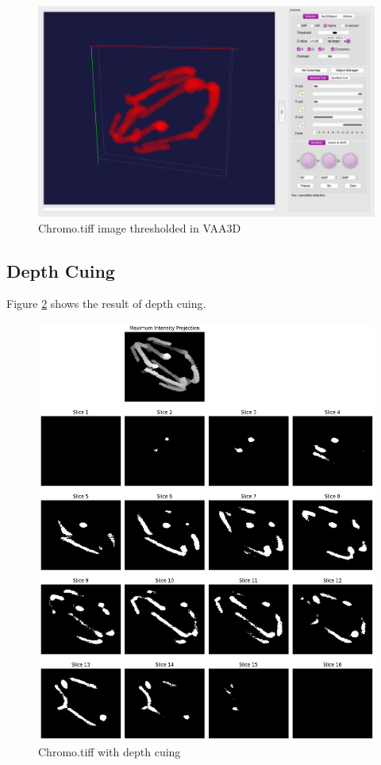 \documentclass{article}
\begin{document}
\begin{figure}
    \centering
    \includegraphics[width=1\linewidth]{Report/Images/vaa3d_thresh.png}
    \caption{Chromo.tiff image thresholded in VAA3D}
    \label{fig:vaa3dthresh}
\end{figure}

\subsection*{Depth Cuing}
Figure \ref{fig:depthcuing} shows the result of depth cuing. 
\begin{figure}
    \centering
    \includegraphics[width=1\linewidth]{Report/Images/mip.png}
    \caption{Chromo.tiff with depth cuing}
    \label{fig:depthcuing}
\end{figure}
\end{document}
